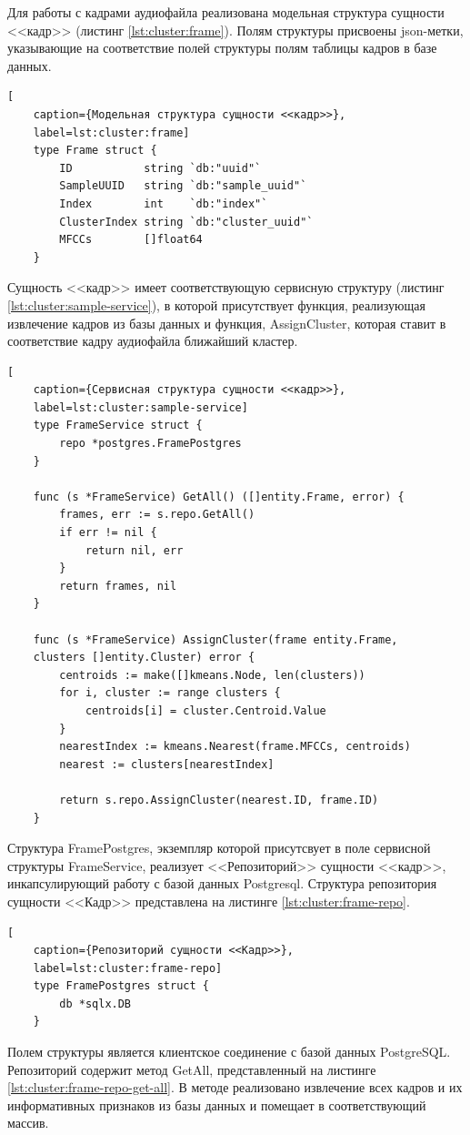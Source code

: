 Для работы с кадрами аудиофайла реализована модельная структура сущности <<кадр>> (листинг  \ref{lst:cluster:frame}). Полям структуры присвоены json-метки, указывающие на соответствие полей структуры полям таблицы кадров в базе данных.
\begin{lstlisting}[
	caption={Модельная структура сущности <<кадр>>},
	label=lst:cluster:frame]
	type Frame struct {
		ID           string `db:"uuid"`
		SampleUUID   string `db:"sample_uuid"`
		Index        int    `db:"index"`
		ClusterIndex string `db:"cluster_uuid"`
		MFCCs        []float64
	}
\end{lstlisting}
Сущность <<кадр>> имеет соответствующую сервисную структуру (листинг \ref{lst:cluster:sample-service}), в которой присутствует функция, реализующая извлечение кадров из базы данных и функция, AssignCluster, которая ставит в соответствие кадру аудиофайла ближайший кластер.
\begin{lstlisting}[
	caption={Сервисная структура сущности <<кадр>>},
	label=lst:cluster:sample-service]
	type FrameService struct {
		repo *postgres.FramePostgres
	}
	
	func (s *FrameService) GetAll() ([]entity.Frame, error) {
		frames, err := s.repo.GetAll()
		if err != nil {
			return nil, err
		}
		return frames, nil
	}
	
	func (s *FrameService) AssignCluster(frame entity.Frame, 
	clusters []entity.Cluster) error {
		centroids := make([]kmeans.Node, len(clusters))
		for i, cluster := range clusters {
			centroids[i] = cluster.Centroid.Value
		}
		nearestIndex := kmeans.Nearest(frame.MFCCs, centroids)
		nearest := clusters[nearestIndex]
		
		return s.repo.AssignCluster(nearest.ID, frame.ID)
	}
\end{lstlisting}
Структура FramePostgres, экземпляр которой присутсвует в поле сервисной структуры FrameService, реализует <<Репозиторий>> сущности <<кадр>>,  инкапсулирующий работу с базой данных Postgresql. Структура репозитория сущности <<Кадр>> представлена на листинге \ref{lst:cluster:frame-repo}.
\begin{lstlisting}[
	caption={Репозиторий сущности <<Кадр>>},
	label=lst:cluster:frame-repo]
	type FramePostgres struct {
		db *sqlx.DB
	}
\end{lstlisting}
Полем структуры является клиентское соединение с базой данных PostgreSQL. Репозиторий содержит метод GetAll, представленный на листинге \ref{lst:cluster:frame-repo-get-all}. В методе реализовано извлечение всех кадров и их информативных признаков из базы данных и помещает в соответствующий массив.
